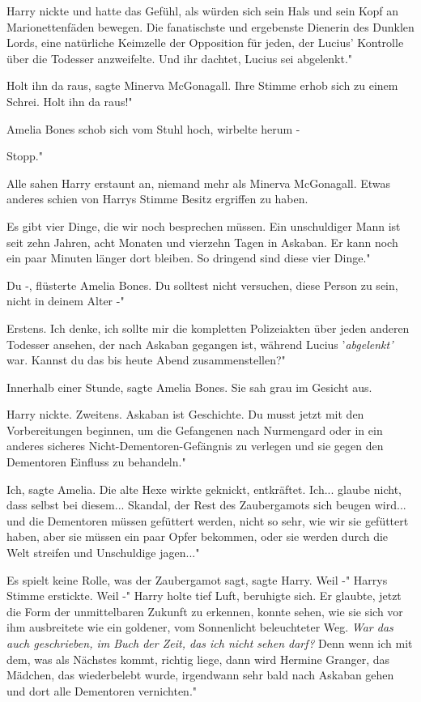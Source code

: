 Harry nickte und hatte das Gefühl, als würden sich sein Hals und sein Kopf an
Marionettenfäden bewegen. \glqq{}Die fanatischste und ergebenste Dienerin des
Dunklen Lords, eine natürliche Keimzelle der Opposition für jeden, der Lucius'
Kontrolle über die Todesser anzweifelte. Und ihr dachtet, Lucius sei abgelenkt."

\glqq{}Holt ihn da raus\grqq{}, sagte Minerva McGonagall. Ihre Stimme erhob sich
zu einem Schrei. \glqq{}Holt ihn da raus!"

Amelia Bones schob sich vom Stuhl hoch, wirbelte herum -

\glqq{}Stopp."

Alle sahen Harry erstaunt an, niemand mehr als Minerva McGonagall. Etwas anderes
schien von Harrys Stimme Besitz ergriffen zu haben.

\glqq{}Es gibt vier Dinge, die wir noch besprechen müssen. Ein unschuldiger Mann
ist seit zehn Jahren, acht Monaten und vierzehn Tagen in Askaban. Er kann noch
ein paar Minuten länger dort bleiben. So dringend sind diese vier Dinge."

\glqq{}Du -\grqq{}, flüsterte Amelia Bones. \glqq{}Du solltest nicht versuchen,
diese Person zu sein, nicht in deinem Alter -"

\glqq{}Erstens. Ich denke, ich sollte mir die kompletten Polizeiakten über jeden
anderen Todesser ansehen, der nach Askaban gegangen ist, während Lucius
'\emph{abgelenkt'} war. Kannst du das bis heute Abend zusammenstellen?"

\glqq{}Innerhalb einer Stunde\grqq{}, sagte Amelia Bones. Sie sah grau im Gesicht
aus.

Harry nickte. \glqq{}Zweitens. Askaban ist Geschichte. Du musst jetzt mit den
Vorbereitungen beginnen, um die Gefangenen nach Nurmengard oder in ein anderes
sicheres Nicht-Dementoren-Gefängnis zu verlegen und sie gegen den Dementoren
Einfluss zu behandeln."

\glqq{}Ich\grqq{}, sagte Amelia. Die alte Hexe wirkte geknickt, entkräftet. \glqq
Ich... glaube nicht, dass selbst bei diesem... Skandal, der Rest des
Zaubergamots sich beugen wird... und die Dementoren müssen gefüttert werden,
nicht so sehr, wie wir sie gefüttert haben, aber sie müssen ein paar Opfer
bekommen, oder sie werden durch die Welt streifen und Unschuldige jagen..."

\glqq{}Es spielt keine Rolle, was der Zaubergamot sagt\grqq{}, sagte Harry. \glqq
Weil -" Harrys Stimme erstickte. \glqq{}Weil -" Harry holte tief Luft, beruhigte
sich. Er glaubte, jetzt die Form der unmittelbaren Zukunft zu erkennen, konnte
sehen, wie sie sich vor ihm ausbreitete wie ein goldener, vom Sonnenlicht
beleuchteter Weg.
\emph{War das auch geschrieben, im Buch der Zeit, das ich nicht sehen darf?}
\glqq{}Denn wenn ich mit dem, was als Nächstes kommt, richtig liege, dann wird
Hermine Granger, das Mädchen, das wiederbelebt wurde, irgendwann sehr bald nach
Askaban gehen und dort alle Dementoren vernichten."

